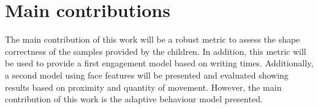\section{Main contributions}
The main contribution of this work will be a robust metric to assess the shape correctness of the samples provided by the children. In addition, this metric will be used to provide a first engagement model based on writing times. Additionally, a second model using face features will be presented and evaluated showing results based on proximity and quantity of movement. However, the main contribution of this work is the adaptive behaviour model presented.


